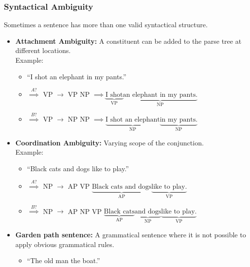             \subsubsection{Syntactical Ambiguity} %
            	Sometimes a sentence has more than one valid syntactical structure.
                \begin{itemize}
                	\item \textbf{Attachment Ambiguity:} A constituent can be added to the parse tree at different locations. \\ Example:
                		\begin{itemize}
                			\item \enquote{I shot an elephant in my pants.}
                			\item[] \( \overset{A?}{\implies} \) VP \(\rightarrow\) VP NP \( \implies \underbrace{\text{I shot}}_{\text{VP}} \underbrace{\text{an elephant in my pants.}}_{\text{NP}} \)
                			\item[] \( \overset{B?}{\implies} \) VP \(\rightarrow\) NP NP \( \implies \underbrace{\text{I shot an elephant}}_{\text{NP}} \underbrace{\text{in my pants.}}_{\text{NP}} \)
                		\end{itemize}
                	\item \textbf{Coordination Ambiguity:} Varying scope of the conjunction. \\ Example:
                		\begin{itemize}
                			\item \enquote{Black cats and dogs like to play.}
                			\item[] \( \overset{A?}{\implies} \) NP \(\rightarrow\) AP VP \( \underbrace{\text{Black cats and dogs}}_{\text{AP}} \underbrace{\text{like to play.}}_{\text{VP}} \)
                			\item[] \( \overset{B?}{\implies} \) NP \(\rightarrow\) AP NP VP \( \underbrace{\text{Black cats}}_{\text{AP}} \underbrace{\text{and dogs}}_{\text{NP}} \underbrace{\text{like to play.}}_{\text{VP}} \)
                		\end{itemize}
                	\item \textbf{Garden path sentence:} A grammatical sentence where it is not possible to apply obvious grammatical rules.
                		\begin{itemize}
                			\item \enquote{The old man the boat.}
                		\end{itemize}
                \end{itemize}
            
